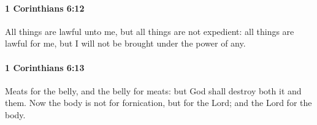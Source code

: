 		\paragraph{1 Corinthians 6:12} %
			\label{1CORINTHIANS-6-12}

			All things are lawful unto me, but all things are not expedient: all things are lawful for me, but I will not be brought under the power of any.

			\begin{framed}
			\scriptsize
				\begin{compactdesc}
					\item[SBLG] 
				\end{compactdesc}
			\end{framed}

		\paragraph{1 Corinthians 6:13} %
			\label{1CORINTHIANS-6-13}

			Meats for the belly, and the belly for meats: but God shall destroy both it and them. Now the body is not for fornication, but for the Lord; and the Lord for the body.

